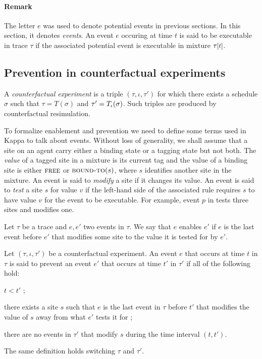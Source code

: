 \paragraph{Remark} The letter $e$ was used to denote potential events
in previous sections. In this section, it denotes
\emph{events}. An event $e$ occuring at time $t$ is said to be
executable in trace $\tau$ if the associated potential event is
executable in mixture $\TSTATE{t}{\tau}$.


\subsection{Prevention in counterfactual experiments}
\label{subsec:cex}\label{subsec:inhibition}

A \textit{counterfactual experiment} is a triple
$(\tau, \iota, \tau')$ for which there exists a schedule $\sigma$ such
that $\tau = T(\sigma)$ and $\tau' = {T_\iota}{}(\sigma)$. Such triples
are produced by counterfactual resimulation.

To formalize enablement and prevention we need to define some terms
used in Kappa to talk about events. Without loss of generality, we
shall assume that a site on an agent carry either a binding state or
a tagging state but not both. The
\textit{value} of a tagged site in a mixture is its current tag and
the value of a binding site is either $\textsc{free}$ or
$\textsc{bound-to}(s)$, where $s$ identifies another site in the
mixture.  An event is said to \emph{modify} a site if it changes its
value.  An event is said to \emph{test} a site $s$ for value $v$ if
the left-hand side of the associated rule requires $s$ to have value
$v$ for the event to be executable. For example, event $p$ in
\RefTrace{} tests three sites and modifies one.



\begin{definition}[Enablement]
  Let $\tau$ be a trace and $e, e'$ two events in $\tau$.  We say that
  $e$ enables $e'$ if $e$ is the last event before $e'$ that modifies
  some site to the value it is tested for by $e'$.
\end{definition}

\begin{definition}[Prevention]
  Let $(\tau, \iota, \tau')$ be a counterfactual experiment. An event
  $e$ that occurs at time $t$ in $\tau$ is said to prevent an event
  $e'$ that occurs at time $t'$ in $\tau'$ if all of the following
  hold:
  \begin{inparaenum}[(1)]
  \item \label{inhibition:time} $t < t'$ ;
  \item \label{inhibition:breaks} there exists a site $s$ such that
    $e$ is the last event in $\tau$ before $t'$ that modifies the
    value of $s$ away from what $e'$ tests it for ;
  \item \label{inhibition:nointf} there are no events in $\tau'$ that
    modify $s$ during the time interval $(t, t')$.
  \end{inparaenum}
  The same definition holds switching $\tau$ and $\tau'$.
\end{definition}

